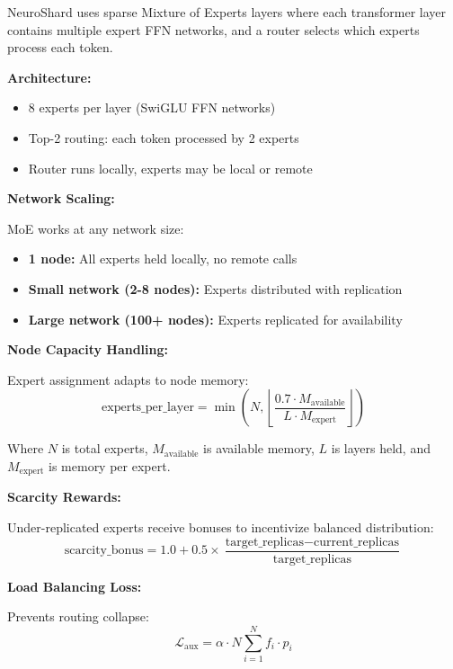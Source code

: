 \documentclass[11pt,a4paper]{article}
\begin{document}
NeuroShard uses sparse Mixture of Experts layers where each transformer layer contains multiple expert FFN networks, and a router selects which experts process each token.

\textbf{Architecture:}
\begin{itemize}
    \item 8 experts per layer (SwiGLU FFN networks)
    \item Top-2 routing: each token processed by 2 experts
    \item Router runs locally, experts may be local or remote
\end{itemize}

\textbf{Network Scaling:}

MoE works at any network size:

\begin{itemize}
    \item \textbf{1 node:} All experts held locally, no remote calls
    \item \textbf{Small network (2-8 nodes):} Experts distributed with replication
    \item \textbf{Large network (100+ nodes):} Experts replicated for availability
\end{itemize}

\textbf{Node Capacity Handling:}

Expert assignment adapts to node memory:
\begin{equation}
\text{experts\_per\_layer} = \min\left(N, \left\lfloor \frac{0.7 \cdot M_{\text{available}}}{L \cdot M_{\text{expert}}} \right\rfloor \right)
\end{equation}

Where $N$ is total experts, $M_{\text{available}}$ is available memory, $L$ is layers held, and $M_{\text{expert}}$ is memory per expert.

\textbf{Scarcity Rewards:}

Under-replicated experts receive bonuses to incentivize balanced distribution:
\begin{equation}
\text{scarcity\_bonus} = 1.0 + 0.5 \times \frac{\text{target\_replicas} - \text{current\_replicas}}{\text{target\_replicas}}
\end{equation}

\textbf{Load Balancing Loss:}

Prevents routing collapse:
\begin{equation}
\mathcal{L}_{\text{aux}} = \alpha \cdot N \sum_{i=1}^{N} f_i \cdot p_i
\end{equation}
\end{document}

